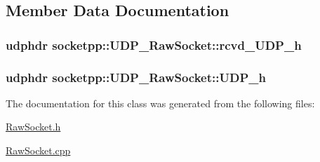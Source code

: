 \subsection{Member Data Documentation}
\hypertarget{classsocketpp_1_1UDP__RawSocket_9b21e1b520434f7b07d5afcc35ceb76c}{
\subsubsection[{rcvd\_\-UDP\_\-h}]{\setlength{\rightskip}{0pt plus 5cm}udphdr {\bf socketpp::UDP\_\-RawSocket::rcvd\_\-UDP\_\-h}}}
\label{classsocketpp_1_1UDP__RawSocket_9b21e1b520434f7b07d5afcc35ceb76c}


\hypertarget{classsocketpp_1_1UDP__RawSocket_fbdcc519279aec772f575237ca25f783}{
\subsubsection[{UDP\_\-h}]{\setlength{\rightskip}{0pt plus 5cm}udphdr {\bf socketpp::UDP\_\-RawSocket::UDP\_\-h}}}
\label{classsocketpp_1_1UDP__RawSocket_fbdcc519279aec772f575237ca25f783}




The documentation for this class was generated from the following files:\begin{CompactItemize}
\item 
\hyperlink{RawSocket_8h}{RawSocket.h}\item 
\hyperlink{RawSocket_8cpp}{RawSocket.cpp}\end{CompactItemize}
